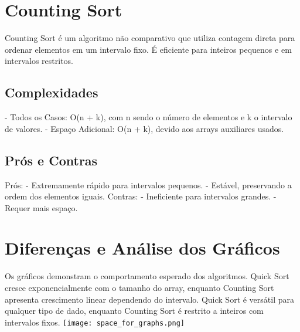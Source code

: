\documentclass{article}%
\begin{document}
%
\section{Counting Sort}%
\label{sec:CountingSort}%
Counting Sort é um algoritmo não comparativo que utiliza contagem direta para ordenar elementos em um intervalo fixo. É eficiente para inteiros pequenos e em intervalos restritos.%
\subsection{Complexidades}%
\label{subsec:Complexidades}%
{-} Todos os Casos: O(n + k), com n sendo o número de elementos e k o intervalo de valores.\newline%
{-} Espaço Adicional: O(n + k), devido aos arrays auxiliares usados.

%
\subsection{Prós e Contras}%
\label{subsec:PrseContras}%
Prós:\newline%
{-} Extremamente rápido para intervalos pequenos.\newline%
{-} Estável, preservando a ordem dos elementos iguais.\newline%
\newline%
Contras:\newline%
{-} Ineficiente para intervalos grandes.\newline%
{-} Requer mais espaço.

%
\section{Diferenças e Análise dos Gráficos}%
\label{sec:DiferenaseAnlisedosGrficos}%
Os gráficos demonstram o comportamento esperado dos algoritmos. Quick Sort cresce exponencialmente com o tamanho do array, enquanto Counting Sort apresenta crescimento linear dependendo do intervalo. Quick Sort é versátil para qualquer tipo de dado, enquanto Counting Sort é restrito a inteiros com intervalos fixos.%
\newline \texttt{[image: space\_for\_graphs.png]}

%
\end{document}
